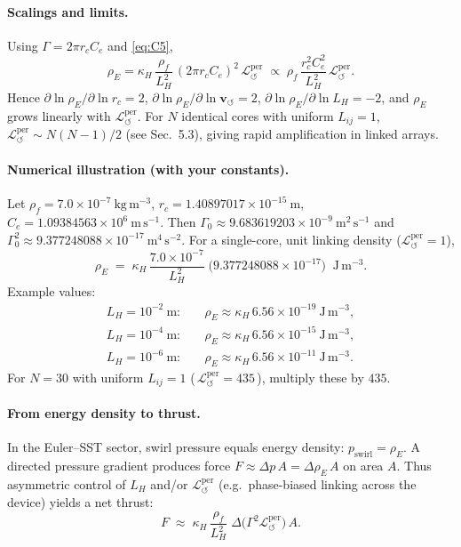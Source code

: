 \documentclass[11pt]{article}
\begin{document}
\paragraph{Scalings and limits.}
    Using $\Gamma = 2\pi r_c C_e$ and \eqref{eq:C5},
    \[
        \rho_{\!E}
        = \kappa_H\,\frac{\rho_{\!f}}{L_H^2}\,(2\pi r_c C_e)^2\,\mathcal{L}_{\circlearrowleft}^{\mathrm{per}}
        \;\propto\;
        \rho_{\!f}\,\frac{r_c^2 C_e^2}{L_H^2}\,\mathcal{L}_{\circlearrowleft}^{\mathrm{per}}.
    \]
    Hence
    $\partial\ln\rho_{\!E}/\partial\ln r_c = 2$,
    $\partial\ln\rho_{\!E}/\partial\ln \mathbf{v}_{\scriptscriptstyle\boldsymbol{\circlearrowleft}} = 2$,
    $\partial\ln\rho_{\!E}/\partial\ln L_H = -2$,
    and $\rho_{\!E}$ grows linearly with $\mathcal{L}_{\circlearrowleft}^{\mathrm{per}}$.
    For $N$ identical cores with uniform $L_{ij}=1$,
    $\mathcal{L}_{\circlearrowleft}^{\mathrm{per}}\!\sim N(N\!-\!1)/2$
    (see Sec.~5.3), giving rapid amplification in linked arrays.

\paragraph{Numerical illustration (with your constants).}
    Let $\rho_{\!f}=7.0\times10^{-7}\ \mathrm{kg\,m^{-3}}$,
    $r_c=1.40897017\times10^{-15}\ \mathrm{m}$,
    $C_e=1.09384563\times10^{6}\ \mathrm{m\,s^{-1}}$.
    Then $\Gamma_0\approx 9.683619203\times10^{-9}\ \mathrm{m^2\,s^{-1}}$
    and $\Gamma_0^2\approx 9.377248088\times10^{-17}\ \mathrm{m^4\,s^{-2}}$.
    For a single-core, unit linking density ($\mathcal{L}_{\circlearrowleft}^{\mathrm{per}}=1$),
    \[
        \rho_{\!E}
        \;=\;
        \kappa_H\,\frac{7.0\times10^{-7}}{L_H^2}\;
        \bigl(9.377248088\times10^{-17}\bigr)
        \;\; \mathrm{J\,m^{-3}}.
    \]
    Example values:
    \begin{align*}
    L_H=10^{-2}\ \mathrm{m}:&\quad \rho_{\!E}\approx
    \kappa_H\,6.56\times10^{-19}\ \mathrm{J\,m^{-3}},\\
    L_H=10^{-4}\ \mathrm{m}:&\quad \rho_{\!E}\approx
    \kappa_H\,6.56\times10^{-15}\ \mathrm{J\,m^{-3}},\\
    L_H=10^{-6}\ \mathrm{m}:&\quad \rho_{\!E}\approx
    \kappa_H\,6.56\times10^{-11}\ \mathrm{J\,m^{-3}}.
    \end{align*}
    For $N=30$ with uniform $L_{ij}=1$ (\,$\mathcal{L}_{\circlearrowleft}^{\mathrm{per}}=435$\,),
    multiply these by $435$.

\paragraph{From energy density to thrust.}
    In the Euler–SST sector, swirl pressure equals energy density:
    $p_{\text{swirl}}=\rho_{\!E}$. A directed pressure gradient produces force
    $F \approx \Delta p \, A = \Delta \rho_{\!E}\,A$ on area $A$.
    Thus asymmetric control of $L_H$ and/or $\mathcal{L}_{\circlearrowleft}^{\mathrm{per}}$
    (e.g.\ phase-biased linking across the device) yields a net thrust:
    \[
        F \;\approx\; \kappa_H\,\frac{\rho_{\!f}}{L_H^{2}}\;\Delta\!\big(\Gamma^{2}\mathcal{L}_{\circlearrowleft}^{\mathrm{per}}\big)\,A.
    \]
\end{document}
